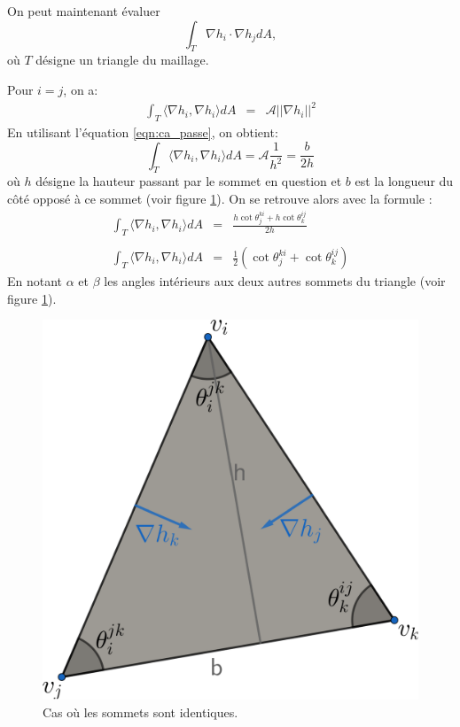 On peut maintenant évaluer
$$\displaystyle\int_{T} \nabla h_i \cdot \nabla h_j dA,$$
où $T$ désigne un triangle du maillage.

Pour $i=j$, on a:
\[
\begin{array}{lcl}
\displaystyle\int_T \langle \nabla h_i, \nabla h_i \rangle dA &= &\mathcal{A}||\nabla h_i||^2
\end{array}
\]
En utilisant l'équation \ref{eqn:ca_passe}, on obtient:
\[
\displaystyle\int_T \langle \nabla h_i, \nabla h_i\rangle dA = \mathcal{A}\displaystyle\frac{1}{h^2}= \displaystyle\frac{b}{2h}
\]
où \(h\) désigne la hauteur passant par le sommet en question et \(b\) est la longueur du côté opposé à ce sommet (voir figure \ref{fig:laplace_cotan_1}). On se retrouve alors avec la formule :
\[
\begin{array}{lcl}
\displaystyle\int_T \langle \nabla h_i, \nabla h_i \rangle dA  &=& \displaystyle\frac{h \cot \theta_j^{ki} + h \cot \theta_k^{ij}}{2h}\\\\
\displaystyle\int_T \langle \nabla h_i, \nabla h_i\rangle dA&=& \displaystyle\frac{1}{2} (\cot \theta_j^{ki} + \cot \theta_k^{ij})
\end{array}
\]
En notant \(\alpha\) et \(\beta\) les angles intérieurs aux deux autres sommets du triangle (voir figure \ref{fig:laplace_cotan_1}).
\begin{figure}[!h]
\centering
\includegraphics[scale=0.48]{images/laplace_cotan_1.pdf}
\caption{Cas où les sommets sont identiques.}
\label{fig:laplace_cotan_1}
\end{figure}

